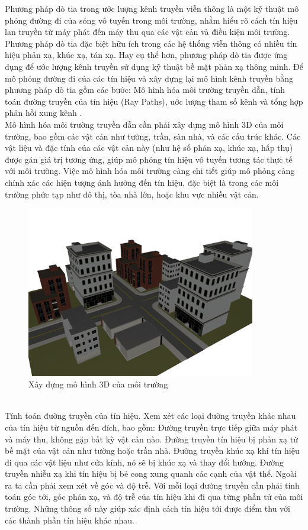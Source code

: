\documentclass{article}
\begin{document}
Phương pháp dò tia trong ước lượng kênh truyền viễn thông là một kỹ thuật mô phỏng đường đi của sóng vô tuyến trong môi trường, nhằm hiểu rõ cách tín hiệu lan truyền từ máy phát đến máy thu qua các vật cản và điều kiện môi trường. Phương pháp dò tia đặc biệt hữu ích trong các hệ thống viễn thông có nhiều tín hiệu phản xạ, khúc xạ, tán xạ. Hay cụ thể hơn, phương pháp dò tia được ứng dụng để ước lượng kênh truyền sử dụng kỹ thuật bề mặt phản xạ thông minh. Để mô phỏng đường đi của các tín hiệu và xây dựng lại mô hình kênh truyền bằng phương pháp dò tia gồm các bước: Mô hình hóa môi trường truyền dẫn, tính toán đường truyền của tín hiệu (Ray Paths), uớc lượng tham số kênh và tổng hợp phản hồi xung kênh .\\

Mô hình hóa môi trường truyền dẫn cần phải xây dựng mô hình 3D của môi trường, bao gồm các vật cản như tường, trần, sàn nhà, và các cấu trúc khác. Các vật liệu và đặc tính của các vật cản này (như hệ số phản xạ, khúc xạ, hấp thụ) được gán giá trị tương ứng, giúp mô phỏng tín hiệu vô tuyến tương tác thực tế với môi trường. Việc mô hình hóa môi trường càng chi tiết giúp mô phỏng càng chính xác các hiện tượng ảnh hưởng đến tín hiệu, đặc biệt là trong các môi trường phức tạp như đô thị, tòa nhà lớn, hoặc khu vực nhiều vật cản.\\

\begin{figure}[h!]
    \centering
    \includegraphics[width =10cm]{photo/2.4.6.png}
    \caption{Xây dựng mô hình 3D của môi trường}
    \label{Hình 10}
\end{figure}\\
Tính toán đường truyền của tín hiệu. Xem xét các loại đường truyền khác nhau của tín hiệu từ nguồn đến đích, bao gồm: Đường truyền trực tiếp giữa máy phát và máy thu, không gặp bất kỳ vật cản nào. Đường truyền tín hiệu bị phản xạ từ bề mặt của vật cản như tường hoặc trần nhà. Đường truyền khúc xạ khi tín hiệu đi qua các vật liệu như cửa kính, nó sẽ bị khúc xạ và thay đổi hướng. Đường truyền nhiễu xạ khi tín hiệu bị bẻ cong xung quanh các cạnh của vật thể. Ngoài ra ta cần phải xem xét về góc và độ trễ. Với mỗi loại đường truyền cần phải tính toán góc tới, góc phản xạ, và độ trễ của tín hiệu khi đi qua từng phần tử của môi trường. Những thông số này giúp xác định cách tín hiệu tới được điểm thu với các thành phần tín hiệu khác nhau.\\
\end{document}
